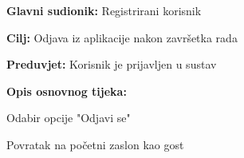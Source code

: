 				\noindent {}
				\begin{packed_item}
					
					\item \textbf{Glavni sudionik: }Registrirani korisnik
					\item  \textbf{Cilj:} Odjava iz aplikacije nakon završetka rada
					\item  \textbf{Preduvjet:} Korisnik je prijavljen u sustav
					\item  \textbf{Opis osnovnog tijeka:}
					
					\item[] \begin{packed_enum}
						
						\item Odabir opcije "Odjavi se"
						\item Povratak na početni zaslon kao gost
					
					\end{packed_enum}
					
				\end{packed_item}
				
				
				
